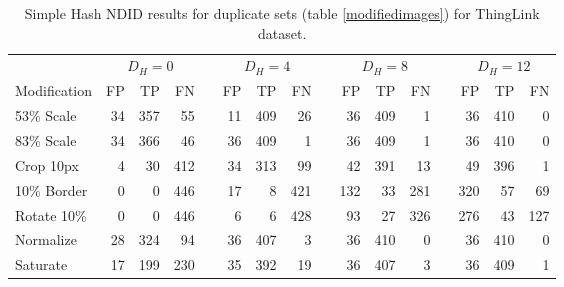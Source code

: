 \documentclass[english,12pt,a4paper,pdftex,elec,utf8]{aaltothesis}
\begin{document}
\begin{table}[htb]\footnotesize
\caption{ Simple Hash NDID results for duplicate sets (table \ref{modifiedimages}) for ThingLink dataset. }
\label{simplethinglinkresults}
\begin{center}
  \setlength\tabcolsep{3pt} %
  \begin{tabular}{@{}lrrrrrrrrrrrrrrr@{}}
    \toprule
    & \multicolumn{3}{c}{$D_H = 0$} &\phantom{abc} &\multicolumn{3}{c}{$D_H = 4$} &\phantom{abc} & \multicolumn{3}{c}{$D_H=8$} &\phantom{abc} & \multicolumn{3}{c}{$D_H=12$}\\
\cmidrule{2-4} \cmidrule{6-8} \cmidrule{10-12} \cmidrule{14-16}
    Modification & FP & TP & FN &\phantom{abc} & FP & TP & FN &\phantom{abc} & FP & TP & FN &\phantom{abc} & FP & TP & FN\\ \midrule
    53\% Scale   & 34 & 357 & 55 &\phantom{abc} & 11 & 409 & 26 &\phantom{abc} & 36 & 409 & 1 &\phantom{abc} & 36 & 410 & 0\\
    83\% Scale   & 34 & 366 & 46 &\phantom{abc} & 36 & 409 & 1 &\phantom{abc} & 36 & 409 & 1 &\phantom{abc} & 36 & 410 & 0\\
    Crop 10px    & 4 & 30 & 412 &\phantom{abc} & 34 & 313 & 99 &\phantom{abc} & 42 & 391 & 13 &\phantom{abc} & 49 & 396 & 1\\
    10\% Border  & 0 & 0 & 446 & \phantom{abc} & 17 & 8 & 421 &\phantom{abc} & 132 & 33 & 281 &\phantom{abc} & 320 & 57 & 69\\
    Rotate 10\%  & 0 & 0 & 446 &\phantom{abc} & 6 & 6 & 428 &\phantom{abc} & 93 & 27 & 326 &\phantom{abc} & 276 & 43 & 127\\
    Normalize    & 28 & 324 & 94 &\phantom{abc} & 36 & 407 & 3 &\phantom{abc} & 36 & 410 & 0 &\phantom{abc} & 36 & 410 & 0\\
    Saturate     & 17 & 199 & 230 &\phantom{abc} & 35 & 392 & 19 &\phantom{abc} & 36 & 407 & 3 &\phantom{abc} & 36 & 409 & 1\\
    \bottomrule
\end{tabular}
\end{center}
\end{table}
\end{document}
